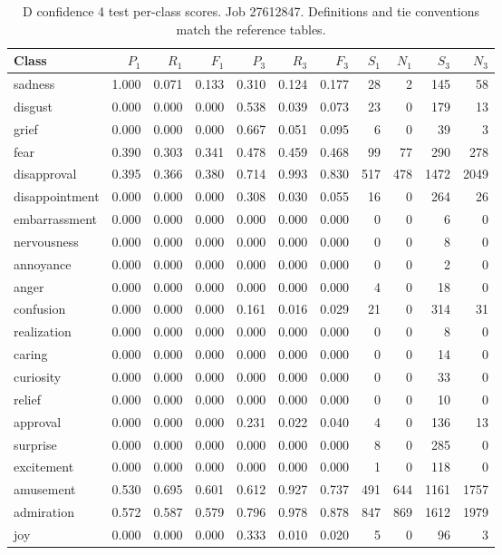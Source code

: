 \begin{table}[!htbp]
\centering
\scriptsize
\setlength{\tabcolsep}{5pt}
\begin{tabular}{lrrrrrrrrrr}
\toprule
Class & $P_1$ & $R_1$ & $F_1$ & $P_3$ & $R_3$ & $F_3$ & $S_1$ & $N_1$ & $S_3$ & $N_3$ \\
\midrule
sadness & 1.000 & 0.071 & 0.133 & 0.310 & 0.124 & 0.177 & 28 & 2 & 145 & 58 \\
disgust & 0.000 & 0.000 & 0.000 & 0.538 & 0.039 & 0.073 & 23 & 0 & 179 & 13 \\
grief & 0.000 & 0.000 & 0.000 & 0.667 & 0.051 & 0.095 & 6 & 0 & 39 & 3 \\
fear & 0.390 & 0.303 & 0.341 & 0.478 & 0.459 & 0.468 & 99 & 77 & 290 & 278 \\
disapproval & 0.395 & 0.366 & 0.380 & 0.714 & 0.993 & 0.830 & 517 & 478 & 1472 & 2049 \\
disappointment & 0.000 & 0.000 & 0.000 & 0.308 & 0.030 & 0.055 & 16 & 0 & 264 & 26 \\
embarrassment & 0.000 & 0.000 & 0.000 & 0.000 & 0.000 & 0.000 & 0 & 0 & 6 & 0 \\
nervousness & 0.000 & 0.000 & 0.000 & 0.000 & 0.000 & 0.000 & 0 & 0 & 8 & 0 \\
annoyance & 0.000 & 0.000 & 0.000 & 0.000 & 0.000 & 0.000 & 0 & 0 & 2 & 0 \\
anger & 0.000 & 0.000 & 0.000 & 0.000 & 0.000 & 0.000 & 4 & 0 & 18 & 0 \\
confusion & 0.000 & 0.000 & 0.000 & 0.161 & 0.016 & 0.029 & 21 & 0 & 314 & 31 \\
realization & 0.000 & 0.000 & 0.000 & 0.000 & 0.000 & 0.000 & 0 & 0 & 8 & 0 \\
caring & 0.000 & 0.000 & 0.000 & 0.000 & 0.000 & 0.000 & 0 & 0 & 14 & 0 \\
curiosity & 0.000 & 0.000 & 0.000 & 0.000 & 0.000 & 0.000 & 0 & 0 & 33 & 0 \\
relief & 0.000 & 0.000 & 0.000 & 0.000 & 0.000 & 0.000 & 0 & 0 & 10 & 0 \\
approval & 0.000 & 0.000 & 0.000 & 0.231 & 0.022 & 0.040 & 4 & 0 & 136 & 13 \\
surprise & 0.000 & 0.000 & 0.000 & 0.000 & 0.000 & 0.000 & 8 & 0 & 285 & 0 \\
excitement & 0.000 & 0.000 & 0.000 & 0.000 & 0.000 & 0.000 & 1 & 0 & 118 & 0 \\
amusement & 0.530 & 0.695 & 0.601 & 0.612 & 0.927 & 0.737 & 491 & 644 & 1161 & 1757 \\
admiration & 0.572 & 0.587 & 0.579 & 0.796 & 0.978 & 0.878 & 847 & 869 & 1612 & 1979 \\
joy & 0.000 & 0.000 & 0.000 & 0.333 & 0.010 & 0.020 & 5 & 0 & 96 & 3 \\
\bottomrule
\end{tabular}
\caption{D confidence 4 test per-class scores. Job 27612847. Definitions and tie conventions match the reference tables.}
\label{tab:classes-d_confidence_k4}
\end{table}
